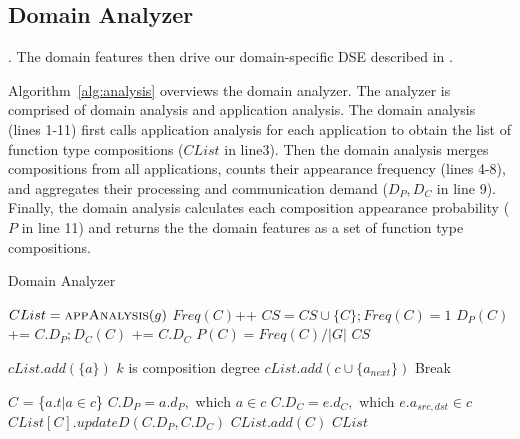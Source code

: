 \subsection{Domain Analyzer}
\label{sec:analyzer} 

 . The domain features then drive our domain-specific DSE described in .

Algorithm~\ref{alg:analysis} overviews the domain analyzer. The analyzer is comprised of domain analysis and application analysis. The domain analysis (lines 1-11) first calls application analysis for each application to obtain the list of function type compositions ($CList$ in line3). Then the domain analysis merges compositions from all applications, counts their appearance frequency (lines 4-8), and aggregates their processing and communication demand ($D_P, D_C$ in line 9). Finally, the domain analysis calculates each composition appearance probability ($P$ in line 11) and returns the the domain features as a set of function type compositions.

\begin{algorithm}
\caption{Domain Analyzer}
\label{alg:analysis}
\begin{algorithmic}[1]
{\footnotesize
{}
		\State $CList = \Call{appAnalysis}{g}$
					\State $Freq(C)$++
				\Else
					\State $CS = CS \cup \{C\}; Freq(C) = 1$
				\EndIf
				\State $D_{P}(C)$ += $C.D_{P}; D_{C}(C)$ += $C.D_{C}$
		\EndFor
	\EndFor
		\State $P(C) = Freq(C) / \left\vert{G}\right\vert$
	\EndFor
	\Return $CS$
\EndFunction
\item[]
		\State $cList.add( \{a\} )$
	\EndFor
	\Comment $k$ is composition degree
					\State $cList.add( c \cup \{a_{next}\} )$
				\EndIf
			\EndFor
		\EndFor
		 Break
	\EndFor

			\State $C$ = \{$a.t \vert a \in c$\}
			 $C.D_{P} = a.d_{P},$ which $a \in c$
			 $C.D_{C} = e.d_{C},$ which $ e.a_{src,dst} \in c$
				\State $CList[C].updateD(C.D_{P},C.D_{C})$
			\Else
				\State $CList.add(C)$
			\EndIf
	\EndFor
	\Return $CList$
\EndFunction
}
\end{algorithmic}
\end{algorithm}

